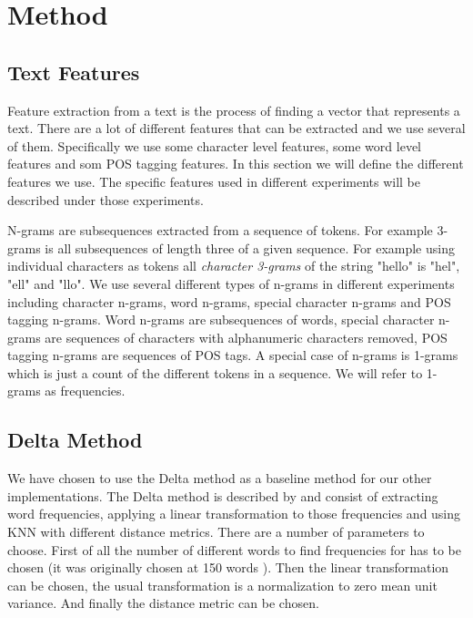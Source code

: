 \section{Method}

\subsection{Text Features}
Feature extraction from a text is the process of finding a vector that
represents a text. There are a lot of different features that can be extracted
and we use several of them. Specifically we use some character level features,
some word level features and som \gls{POS} tagging features. In this section
we will define the different features we use. The specific features used in
different experiments will be described under those experiments.

N-grams are subsequences extracted from a sequence of tokens. For example
3-grams is all subsequences of length three of a given sequence. For example
using individual characters as tokens all \textit{character 3-grams} of the
string "hello" is "hel", "ell" and "llo". We use several different types of
n-grams in different experiments including character n-grams, word n-grams,
special character n-grams and \gls{POS} tagging n-grams. Word n-grams are
subsequences of words, special character n-grams are sequences of characters
with alphanumeric characters removed, \gls{POS} tagging n-grams are sequences of
\gls{POS} tags. A special case of n-grams is 1-grams which is just a count of
the different tokens in a sequence. We will refer to 1-grams as frequencies.

\subsection{Delta Method}
We have chosen to use the Delta method as a baseline method for our other
implementations. The Delta method is described by \cite{evert2015towards} and
consist of extracting word frequencies, applying a linear transformation to
those frequencies and using \gls{KNN} with different distance metrics. There are
a number of parameters to choose. First of all the number of different words to
find frequencies for has to be chosen (it was originally chosen at 150 words
\cite{evert2015towards}). Then the linear transformation can be chosen, the
usual transformation is a normalization to zero mean unit variance. And finally
the distance metric can be chosen.

